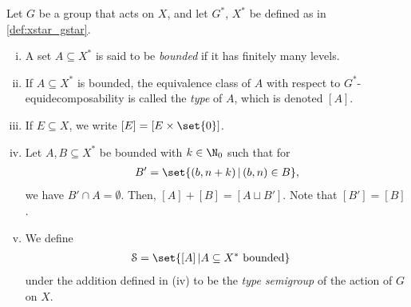 \begin{definition}\label{def:type_semigroup}
  Let $G$ be a group that acts on $X$, and let $G^{\ast}$, $X^{\ast}$ be defined as in \ref{def:xstar_gstar}.
  \begin{enumerate}[(i)]
    \item A set $A\subseteq X^{\ast}$ is said to be \textit{bounded} if it has finitely many levels.
    \item If $A\subseteq X^{\ast}$ is bounded, the equivalence class of $A$ with respect to $G^{\ast}$-equidecomposability is called the \textit{type} of $A$, which is denoted $\left[A\right]$.
    \item If $E\subseteq X$, we write $\left[E\right] = \left[E\times \set{0}\right]$.
    \item Let $A,B\subseteq X^{\ast}$ be bounded with $k\in \N_{0}$ such that for
      \begin{align*}
        B'= \set{\left(b,n+k\right)| \left(b,n\right)\in B},
      \end{align*}
      we have $B'\cap A = \emptyset$. Then, $\left[A\right] + \left[B\right] = \left[A\sqcup B'\right]$. Note that $\left[B'\right] = \left[B\right]$.
    \item We define
      \begin{align*}
        \mathcal{S} &= \set{\left[A\right]| A\subseteq X^{\ast}\text{ bounded}}
      \end{align*}
      under the addition defined in (iv) to be the \textit{type semigroup} of the action of $G$ on $X$.
  \end{enumerate}
\end{definition}


